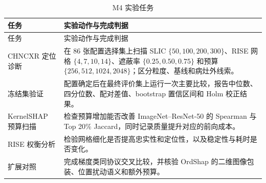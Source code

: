 {\small
    \begin{xltabular}{\textwidth}{>{\raggedright\arraybackslash}p{4.0cm}>{\raggedright\arraybackslash}X}
        \caption{M4 实验任务}\label{tab:m4-plan} \\
        \toprule
        任务 & 实验动作与完成判据 \\
        \midrule
        \endfirsthead
        \toprule
        任务 & 实验动作与完成判据 \\
        \midrule
        \endhead
        CHNCXR 定位诊断 & 在 86 张配置选择集上扫描 SLIC $\{50,100,200,300\}$、RISE 网格 $\{4,7,10,14\}$、遮蔽率 $\{0.25,0.50,0.75\}$ 和预算 $\{256,512,1024,2048\}$；区分粒度、基线和病灶外线索。 \\
        冻结集验证 & 配置确定后在最终评价集上运行一次主要比较，报告中位数、四分位数、配对差值、bootstrap 置信区间和 Holm 校正结果。 \\
        KernelSHAP 预算扫描 & 检查预算增加能否改善 ImageNet--ResNet-50 的 Spearman 与 Top 20\% Jaccard，同时记录质量提升对应的前向成本。 \\
        RISE 权衡分析 & 检验网格细化是否提高忠实性和定位性，以及稳定性与耗时是否变化。 \\
        扩展对照 & 完成梯度类同协议交叉比较，并核验 OrdShap 的二维图像包装、位置扰动语义和额外预算。 \\
        \bottomrule
    \end{xltabular}
}
